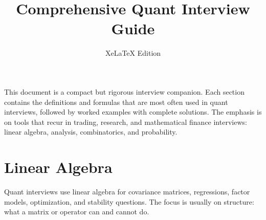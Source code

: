 \documentclass[11pt]{article}
\title{\textbf{Comprehensive Quant Interview Guide}}
\author{}
\date{XeLaTeX Edition}
\theoremstyle{definition}
\begin{document}
\maketitle

This document is a compact but rigorous interview companion. Each section contains the definitions and formulas that are most often used in quant interviews, followed by worked examples with complete solutions. The emphasis is on tools that recur in trading, research, and mathematical finance interviews: linear algebra, analysis, combinatorics, and probability.

\tableofcontents
\newpage

\section{Linear Algebra}
Quant interviews use linear algebra for covariance matrices, regressions, factor models, optimization, and stability questions. The focus is usually on structure: what a matrix or operator can and cannot do.
\end{document}
